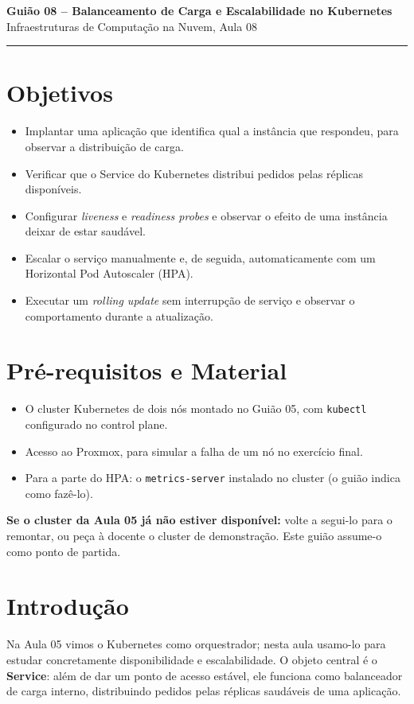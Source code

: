 \documentclass[11pt,a4paper]{article}
\newcommand{\guiaotitle}[2]{%
  \begin{center}
  {\Large\bfseries\color{TextEspresso} #1}\\[0.3cm]
  {\normalsize\color{NudeTaupe} #2}\\[0.2cm]
  {\color{NudeTaupe}\rule{4cm}{0.5pt}}
  \end{center}
  \vspace{0.5cm}
}
\begin{document}
\guiaotitle{Guião 08 -- Balanceamento de Carga e Escalabilidade no Kubernetes}{Infraestruturas de Computação na Nuvem, Aula 08}

\section{Objetivos}
\begin{itemize}[itemsep=0.2cm]
  \item Implantar uma aplicação que identifica qual a instância que respondeu, para observar a distribuição de carga.
  \item Verificar que o Service do Kubernetes distribui pedidos pelas réplicas disponíveis.
  \item Configurar \emph{liveness} e \emph{readiness probes} e observar o efeito de uma instância deixar de estar saudável.
  \item Escalar o serviço manualmente e, de seguida, automaticamente com um Horizontal Pod Autoscaler (HPA).
  \item Executar um \emph{rolling update} sem interrupção de serviço e observar o comportamento durante a atualização.
\end{itemize}

\section{Pré-requisitos e Material}
\begin{itemize}[itemsep=0.2cm]
  \item O cluster Kubernetes de dois nós montado no Guião 05, com \texttt{kubectl} configurado no control plane.
  \item Acesso ao Proxmox, para simular a falha de um nó no exercício final.
  \item Para a parte do HPA: o \texttt{metrics-server} instalado no cluster (o guião indica como fazê-lo).
\end{itemize}

\textbf{Se o cluster da Aula 05 já não estiver disponível:} volte a segui-lo para o remontar, ou peça à docente o cluster de demonstração. Este guião assume-o como ponto de partida.

\section{Introdução}
Na Aula 05 vimos o Kubernetes como orquestrador; nesta aula usamo-lo para estudar concretamente disponibilidade e escalabilidade. O objeto central é o \textbf{Service}: além de dar um ponto de acesso estável, ele funciona como balanceador de carga interno, distribuindo pedidos pelas réplicas saudáveis de uma aplicação.
\end{document}
